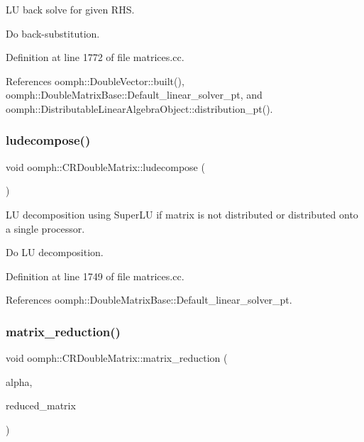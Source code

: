 LU back solve for given R\+HS. 

Do back-\/substitution. 

Definition at line 1772 of file matrices.\+cc.



References oomph\+::\+Double\+Vector\+::built(), oomph\+::\+Double\+Matrix\+Base\+::\+Default\+\_\+linear\+\_\+solver\+\_\+pt, and oomph\+::\+Distributable\+Linear\+Algebra\+Object\+::distribution\+\_\+pt().

\mbox{\label{classoomph_1_1CRDoubleMatrix_a4b90203edbcbfec4e5e1c79f7d8d2722}} 
\subsubsection{\texorpdfstring{ludecompose()}{ludecompose()}}
{\footnotesize\ttfamily void oomph\+::\+C\+R\+Double\+Matrix\+::ludecompose (\begin{DoxyParamCaption}{ }\end{DoxyParamCaption})\hspace{0.3cm}{\ttfamily [virtual]}}



LU decomposition using Super\+LU if matrix is not distributed or distributed onto a single processor. 

Do LU decomposition. 

Definition at line 1749 of file matrices.\+cc.



References oomph\+::\+Double\+Matrix\+Base\+::\+Default\+\_\+linear\+\_\+solver\+\_\+pt.

\mbox{\label{classoomph_1_1CRDoubleMatrix_a3853068b7fce9e83bc817930262e9ca1}} 
\subsubsection{\texorpdfstring{matrix\+\_\+reduction()}{matrix\_reduction()}}
{\footnotesize\ttfamily void oomph\+::\+C\+R\+Double\+Matrix\+::matrix\+\_\+reduction (\begin{DoxyParamCaption}\item[{const double \&}]{alpha,  }\item[{\hyperlink{classoomph_1_1CRDoubleMatrix}{C\+R\+Double\+Matrix} \&}]{reduced\+\_\+matrix }\end{DoxyParamCaption})}



